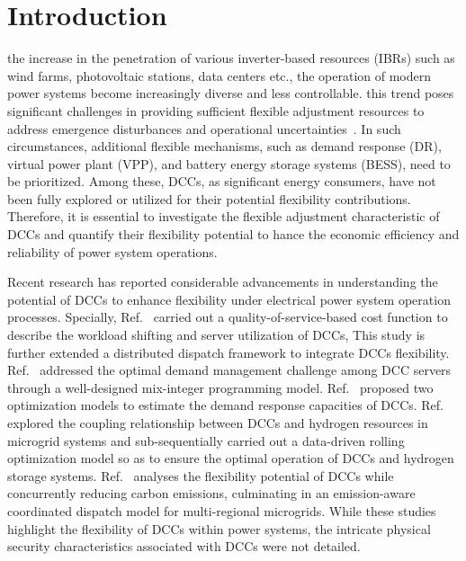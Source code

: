 \documentclass[lettersize,journal]{IEEEtran}
\begin{document}

\setlength{\nomlabelwidth}{1.50cm} %
\setlength{\nomitemsep}{0.025cm} %
\printnomenclature

\section{Introduction}

 the increase in the penetration of various inverter-based resources (IBRs) such as wind farms, photovoltaic stations, data centers etc., the operation of modern power systems become increasingly
diverse and less controllable. this trend poses significant challenges in providing sufficient flexible adjustment resources to address emergence disturbances and operational uncertainties~\cite{zhou2025data}. In such circumstances, additional
flexible mechanisms, such as demand response (DR), virtual power plant (VPP), and battery energy storage systems (BESS), need to be prioritized. Among these, DCCs, as significant energy consumers, have not been fully explored or utilized for their potential flexibility contributions. Therefore, it is essential to investigate the flexible adjustment characteristic of DCCs and quantify their flexibility potential to hance the economic efficiency and reliability of power system operations.

Recent research has reported considerable advancements in understanding the potential of DCCs to enhance flexibility under electrical power system operation processes. Specially,
Ref.~\cite{10874152} carried out a quality-of-service-based cost function to describe the workload shifting and server utilization of DCCs, This study is further extended a distributed dispatch framework to integrate DCCs flexibility.
Ref.~\cite{6041050} addressed the optimal demand management challenge among DCC servers  through a well-designed mix-integer programming model.
Ref.~\cite{7039172} proposed two optimization models to estimate the demand response capacities of DCCs.
Ref.~\cite{10806734} explored the coupling relationship between DCCs and hydrogen resources in microgrid systems and sub-sequentially carried out a data-driven rolling optimization model so as to ensure the optimal operation of DCCs and hydrogen storage systems.
Ref.~\cite{doi:10.1049/icp.2025.0664} analyses the flexibility potential of DCCs while concurrently reducing carbon emissions, culminating in an emission-aware coordinated dispatch model for multi-regional microgrids.
While these studies highlight the flexibility of DCCs within power systems, the intricate physical security characteristics associated with DCCs were not detailed.
\end{document}
